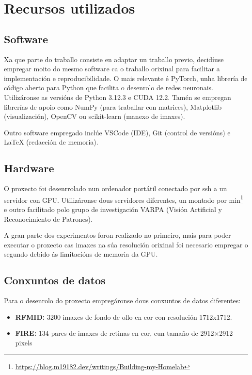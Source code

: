 \section{Recursos utilizados}
\label{sec:Recursos utilizados}

\subsection{Software}
\label{subsec:Software}

Xa que parte do traballo consiste en adaptar un traballo previo, 
decidíuse empregar moito do mesmo software ca o traballo orixinal para facilitar a implementación e reproducibilidade.
O mais relevante é PyTorch, unha librería de código aberto para Python que facilita o desenrolo de redes neuronais. Utilizáronse as versións de Python 3.12.3 e CUDA 12.2. Tamén se empregan librerías de apoio como NumPy (para traballar con matrices), Matplotlib (visualización), OpenCV ou scikit-learn (manexo de imaxes).

Outro software empregado inclúe VSCode (IDE), Git (control de versións) e LaTeX (redacción de memoria).

\subsection{Hardware}
\label{subsec:Hardware}

O proxecto foi desenrrolado nun ordenador portátil conectado por ssh a un servidor con GPU. 
Utilizáronse dous servidores diferentes, un montado por min\footnote{\url{https://blog.m19182.dev/writings/Building-my-Homelab}} e outro facilitado polo grupo de investigación VARPA (Visión Artificial y Reconocimiento de Patrones).

A gran parte dos experimentos foron realizado no primeiro, mais para poder executar o proxecto cas imaxes na súa resolución orixinal foi necesario empregar o segundo 
debido ás limitacións de memoria da GPU. 

\subsection{Conxuntos de datos}
\label{subsec:Conxuntos de datos}
Para o desenrolo do proxecto empregáronse dous conxuntos de datos diferentes:

\begin{itemize}
    \item \textbf{RFMID:} 3200 imaxes de fondo de ollo en cor con resolución 1712x1712.
    \item \textbf{FIRE:} 134 pares de imaxes de retinas en cor, cun tamaño de 2912×2912 pixels
\end{itemize}

